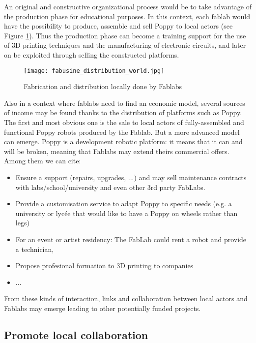 An original and constructive organizational process would be to take advantage of the production phase for educational purposes. In this context, each fablab would have the possibility to produce, assemble and sell Poppy to local actors (see Figure \ref{fig:world_fab}). Thus the production phase can become a training support for the use of 3D printing techniques and the manufacturing of electronic circuits, and later on be exploited through selling the constructed platforms.


\begin{figure}[tb]
    \begin{center}
        \texttt{[image: fabusine\_distribution\_world.jpg]}
    \end{center}
    \caption{Fabrication and distribution locally done by Fablabs}
    \label{fig:world_fab}
\end{figure}


Also in a context where fablabs need to find an economic model, several sources of income may be found thanks to the distribution of platforms such as Poppy. The first and most obvious one is the sale to local actors of fully-assembled and functional Poppy robots produced by the Fablab. But a more advanced model can emerge. Poppy is a development robotic platform: it means that it can and will be broken, meaning that Fablabs may extend theirs commercial offers. Among them we can cite:

\begin{itemize}
    \item Ensure a support (repairs, upgrades, ...) and may sell maintenance contracts with labs/school/university and even other 3rd party FabLabs.
    \item Provide a customisation service to adapt Poppy to specific needs (e.g. a university or lycée that would like to have a Poppy on wheels rather than legs)
    \item For an event or artist residency: The FabLab could rent a robot and provide a technician,
    \item Propose profesional formation to 3D printing to companies
    \item ...
\end{itemize}

From these kinds of interaction, links and collaboration between local actors and Fablabs may emerge leading to other potentially funded projects.

\subsection{Promote local collaboration} %

